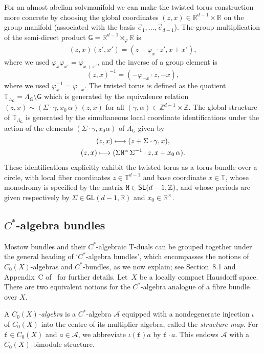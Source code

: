 \documentclass[pdftex]{sigma}
\numberwithin{equation}{section}
\newcommand{\sfG}{\mathsf{G}}
\newcommand{\sfGL}{\mathsf{GL}}
\newcommand{\sfSL}{\mathsf{SL}}
\newcommand{\zed}{{\mathbb Z}} %
\newcommand{\real}{{\mathbb R}} %
\newcommand{\torus}{{\mathbb T}} %
\def\alg{{\mathcal A}}
\begin{document}
For an almost abelian solvmanifold we can make the twisted torus construction more concrete
by choosing the global
coordinates $(z,x)\in\real^{d-1}\times\real$ on the group
manifold (associated with the basis $\vec e_1,\ldots,\vec e_{d-1}$).
The group multiplication of the semi-direct product
$\sfG=\real^{d-1}\rtimes_\varphi\real$ is
\begin{gather}\label{eq:grouplaw}
(z,x) (z',x') = (z + \varphi_x\cdot z',x+x') ,
\end{gather}
where we used $\varphi_x \varphi_{x'} = \varphi_{x+x'}$, and the
inverse of a group element is
\[
(z,x)^{-1} = (-\varphi_{-x}\cdot z,-x) ,
\]
where we used $\varphi_x^{-1}=\varphi_{-x}$.
The twisted torus is defined as the quotient $\torus_{\Lambda_\sfG}=\Lambda_\sfG
{\setminus} \sfG$ which is generated by the equivalence relation $(z,x)\sim
(\Sigma\cdot\gamma,x_0\,\alpha)\,(z,x)$ for all $(\gamma,\alpha)\in\zed^{d-1}\times\zed$. The global structure
of $\torus_{\Lambda_{\sfG}}$ is generated by the simultaneous local coordinate
identifications under the action of the elements
$(\Sigma\cdot\gamma,x_0 \alpha) $ of $\Lambda_\sfG$ given by
\begin{gather}
(z,x) \longmapsto (
 z+\Sigma\cdot\gamma,x) , \nonumber \\
(z,x) \longmapsto (
\Sigma {\tt M}^\alpha\,\Sigma^{-1}\cdot z,x+x_0\,\alpha) .\label{eq:Mostowtorus}
\end{gather}
These identifications explicitly exhibit the twisted torus as a torus bundle over a circle, with
local fiber coordinates $z\in \torus^{d-1}$ and base coordinate $x\in \torus$,
 whose monodromy is specified by the matrix ${\tt M}\in
 \sfSL(d-1,\zed)$, and whose periods are given respectively by
 $\Sigma\in\sfGL(d-1,\real)$ and $x_0\in\real^\times$.

\subsection{$C^*$-algebra bundles}\label{sec:C*bundles}

Mostow bundles and their $C^*$-algebraic T-duals can be grouped together
under the general heading of `$C^*$-algebra bundles', which encompasses
the notions of $C_0(X)$-algebras and $C^*$-bundles, as we now
explain; see Section~8.1 and Appendix~C of~\cite{Williams2007} for
further details.
Let~$X$ be a locally compact Hausdorff space. There are two equivalent
notions for the $C^*$-algebra analogue of a fibre bundle over $X$.

A \emph{$C_0(X)$-algebra} is a $C^*$-algebra $\alg$
equipped with a nondegenerate injection $\iota$ of $C_0(X)$
into the centre of its multiplier algebra, called the \emph{structure
 map}. For $\mathtt{f}\in C_0(X)$ and
$a\in\alg$, we abbreviate $\iota(\mathtt{f})a$ by $\mathtt{f}\cdot a$. This endows
$\alg$ with a $C_0(X)$-bimodule
structure.
\end{document}
